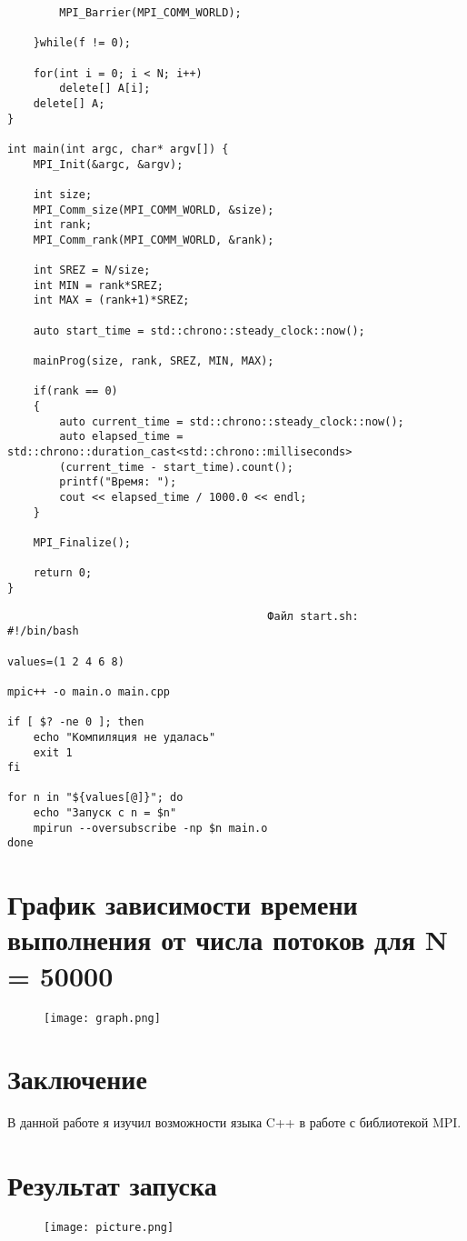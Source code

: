 \documentclass[a4paper, 14pt]{extarticle}
\begin{document}
\begin{verbatim}
        MPI_Barrier(MPI_COMM_WORLD);

    }while(f != 0);

    for(int i = 0; i < N; i++)
        delete[] A[i];
    delete[] A;
}

int main(int argc, char* argv[]) {
    MPI_Init(&argc, &argv);

    int size;
    MPI_Comm_size(MPI_COMM_WORLD, &size);
    int rank;
    MPI_Comm_rank(MPI_COMM_WORLD, &rank);

    int SREZ = N/size;
    int MIN = rank*SREZ;
    int MAX = (rank+1)*SREZ;

    auto start_time = std::chrono::steady_clock::now();

    mainProg(size, rank, SREZ, MIN, MAX);

    if(rank == 0)
    {
        auto current_time = std::chrono::steady_clock::now();
        auto elapsed_time = std::chrono::duration_cast<std::chrono::milliseconds>
        (current_time - start_time).count();
        printf("Время: ");
        cout << elapsed_time / 1000.0 << endl;
    }

    MPI_Finalize();

    return 0;
}
\end{verbatim}

\begin{verbatim}
                                        Файл start.sh:
#!/bin/bash

values=(1 2 4 6 8)

mpic++ -o main.o main.cpp

if [ $? -ne 0 ]; then
    echo "Компиляция не удалась"
    exit 1
fi

for n in "${values[@]}"; do
    echo "Запуск с n = $n"
    mpirun --oversubscribe -np $n main.o
done
\end{verbatim}

\section{График зависимости времени выполнения от числа потоков для N = 50000}\label{Sect::task}

\begin{figure}[H]
    \centering
    \texttt{[image: graph.png]}
    \label{fig:enter-label}
\end{figure}

\section{Заключение}

    В данной работе я изучил возможности языка C++ в работе с библиотекой MPI. 

\section{Результат запуска}
    
\begin{figure}[H]
	\centering
	\texttt{[image: picture.png]}
\label{fig:picture.png}
\end{figure}
\end{document}
